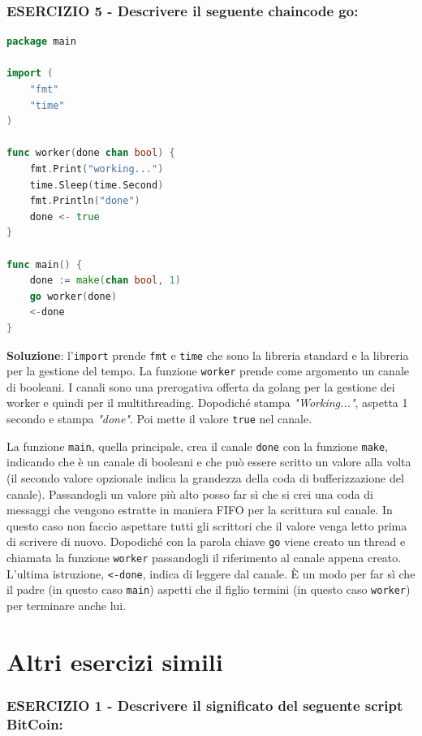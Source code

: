 \vspace{5mm}

\subsubsection{ESERCIZIO 5 - Descrivere il seguente chaincode go:}
\begin{lstlisting}[language=Go]
package main

import (
    "fmt"
    "time"
)

func worker(done chan bool) {
    fmt.Print("working...")
    time.Sleep(time.Second)
    fmt.Println("done")
    done <- true
}

func main() {
    done := make(chan bool, 1)
    go worker(done)
    <-done
}
\end{lstlisting}
\textbf{Soluzione}: l'\texttt{import} prende \texttt{fmt} e \texttt{time} che sono la libreria standard e la libreria per la gestione del tempo. La funzione \texttt{worker} prende come argomento un canale di booleani. I canali sono una prerogativa offerta da golang per la gestione dei worker e quindi per il multithreading. Dopodiché stampa \textit{"Working..."}, aspetta 1 secondo e stampa \textit{"done"}. Poi mette il valore \texttt{true} nel canale.

La funzione \texttt{main}, quella principale, crea il canale \texttt{done} con la funzione \texttt{make}, indicando che è un canale di booleani e che può essere scritto un valore alla volta (il secondo valore opzionale indica la grandezza della coda di bufferizzazione del canale). Passandogli un valore più alto posso far sì che si crei una coda di messaggi che vengono estratte in maniera FIFO per la scrittura sul canale. In questo caso non faccio aspettare tutti gli scrittori che il valore venga letto prima di scrivere di nuovo. Dopodiché con la parola chiave \texttt{go} viene creato un thread e chiamata la funzione \texttt{worker} passandogli il riferimento al canale appena creato. L'ultima istruzione, \texttt{<-done}, indica di leggere dal canale. È un modo per far sì che il padre (in questo caso \texttt{main}) aspetti che il figlio termini (in questo caso \texttt{worker}) per terminare anche lui.

\section{Altri esercizi simili}
\subsubsection{\textbf{ESERCIZIO 1} - Descrivere il significato del seguente script BitCoin:}

